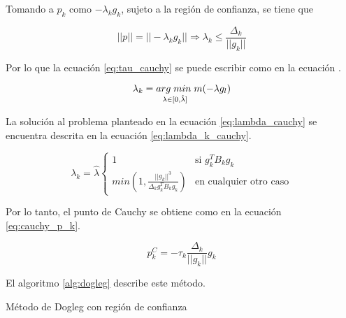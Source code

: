 Tomando a $p_k$ como $-\lambda_k g_k$, sujeto a la región de confianza, se tiene que

\begin{equation*}
    ||p|| = ||-\lambda_k g_k|| \Rightarrow \lambda_k \leq \frac{\Delta_k}{||g_k||}
\end{equation*}


Por lo que la ecuación \ref{eq:tau_cauchy} se puede escribir como en la ecuación .

\begin{equation}
    \lambda_k = \underset{\lambda \in [0,\hat{\lambda}]}{arg\; min\;}  m(-\lambda g_l) \label{eq:lambda_cauchy}
\end{equation}

La solución al problema planteado en la ecuación \ref{eq:lambda_cauchy} se encuentra descrita en la ecuación \ref{eq:lambda_k_cauchy}.

\begin{equation}
    \lambda_k = \hat{\lambda} \left\{\begin{matrix}
        1                                                            & \text{si } g^T_k B_k g_k      \\
        min\left(1, \frac{||g_k||^3}{\Delta_k g_k^T B_k g_k} \right) & \text{en cualquier otro caso}
    \end{matrix}\right. \label{eq:lambda_k_cauchy}
\end{equation}

Por lo tanto, el punto de Cauchy se obtiene como en la ecuación \ref{eq:cauchy_p_k}.

\begin{equation}
    p_k^C = -\tau_k \frac{\Delta_k}{||g_k||} g_k \label{eq:cauchy_p_k}
\end{equation}

El algoritmo \ref{alg:dogleg} describe este método.

\begin{algorithm}
    \caption{Método de Dogleg con región de confianza}
    \label{alg:dogleg}
\end{algorithm}


